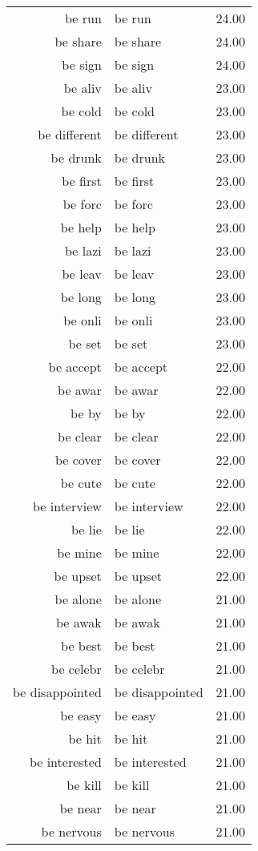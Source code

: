 \begin{table}[ht]
\begin{tabular}{rlr}
  be run & be run & 24.00 \\ 
  be share & be share & 24.00 \\ 
  be sign & be sign & 24.00 \\ 
  be aliv & be aliv & 23.00 \\ 
  be cold & be cold & 23.00 \\ 
  be different & be different & 23.00 \\ 
  be drunk & be drunk & 23.00 \\ 
  be first & be first & 23.00 \\ 
  be forc & be forc & 23.00 \\ 
  be help & be help & 23.00 \\ 
  be lazi & be lazi & 23.00 \\ 
  be leav & be leav & 23.00 \\ 
  be long & be long & 23.00 \\ 
  be onli & be onli & 23.00 \\ 
  be set & be set & 23.00 \\ 
  be accept & be accept & 22.00 \\ 
  be awar & be awar & 22.00 \\ 
  be by & be by & 22.00 \\ 
  be clear & be clear & 22.00 \\ 
  be cover & be cover & 22.00 \\ 
  be cute & be cute & 22.00 \\ 
  be interview & be interview & 22.00 \\ 
  be lie & be lie & 22.00 \\ 
  be mine & be mine & 22.00 \\ 
  be upset & be upset & 22.00 \\ 
  be alone & be alone & 21.00 \\ 
  be awak & be awak & 21.00 \\ 
  be best & be best & 21.00 \\ 
  be celebr & be celebr & 21.00 \\ 
  be disappointed & be disappointed & 21.00 \\ 
  be easy & be easy & 21.00 \\ 
  be hit & be hit & 21.00 \\ 
  be interested & be interested & 21.00 \\ 
  be kill & be kill & 21.00 \\ 
  be near & be near & 21.00 \\ 
  be nervous & be nervous & 21.00 \\ 

\end{tabular}
\end{table}
